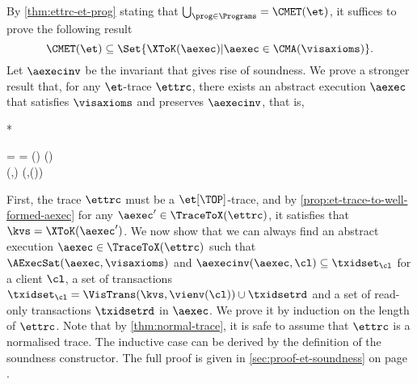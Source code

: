 \begin{proofsketch}
    By \cref{thm:ettrc-et-prog} stating that \( \bigcup_{\prog \in \Programs} = \CMET(\et)\),
    it suffices to prove the following result
    \[
        \CMET(\et) \subseteq \Set{ \XToK(\aexec) | \aexec \in \CMA(\visaxioms) } .
    \]
    Let \( \aexecinv \) be the invariant that gives rise of soundness.
    We prove a stronger result that, for any \( \et\)-trace \( \ettrc \),
    there exists an abstract execution \( \aexec \) that satisfies \( \visaxioms \) 
    and preserves \( \aexecinv \), that is,
    \begin{Formulae}*
    \begin{Formula}
        \ettrc = \ToRed{ \kvsinit | \vienvinit | \stub | * -> \kvs | \vienv }
        \land \kvs = \XToK(\aexec) \land \aexec \in \CMA(\visaxioms) 
        \\ {} \land \Forall{ \cl \in \Dom(\vienv) }
        \aexecinv(\aexec,\cl) \subseteq \VisTrans(\kvs,\vienv(\cl))
    \end{Formula}
    \end{Formulae}
    First, the trace \( \ettrc \) must be a \( \et[\TOP]\)-trace,
    and by \cref{prop:et-trace-to-well-formed-aexec} for any \( \aexec' \in \TraceToX(\ettrc)\),
    it satisfies that \( \kvs = \XToK(\aexec') \).
    We now show that we can always find an abstract execution \( \aexec \in \TraceToX(\ettrc) \)
    such that \( \AExecSat(\aexec,\visaxioms) \) and \( \aexecinv(\aexec,\cl) \subseteq \txidset_\cl \)
    for a client \( \cl \), a set of transactions 
    \( \txidset_\cl = \VisTrans(\kvs,\vienv(\cl)) \cup \txidsetrd \) 
    and a set of read-only transactions \( \txidsetrd\) in \( \aexec \).
    We prove it by induction on the length of \( \ettrc \).
    Note that by \cref{thm:normal-trace}, it is safe to assume that \( \ettrc \) is a normalised trace.
    The inductive case can be derived by the definition of the soundness constructor.
    The full proof is given in \cref{sec:proof-et-soundness} on page \pageref{sec:proof-et-soundness}.
\end{proofsketch}
